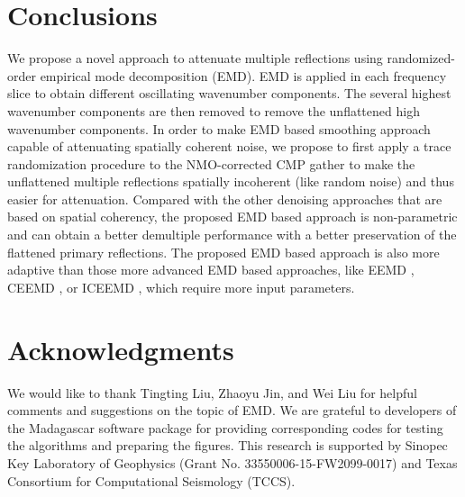 







\section{Conclusions}
We propose a novel approach to attenuate multiple reflections using randomized-order empirical mode decomposition (EMD). EMD is applied in each frequency slice to obtain different oscillating wavenumber components. The several highest wavenumber components are then removed to remove the unflattened high wavenumber components. In order to make EMD based smoothing approach capable of attenuating spatially coherent noise, we propose to first apply a trace randomization procedure to the NMO-corrected CMP gather to make the unflattened multiple reflections spatially incoherent (like random noise) and thus easier for attenuation. Compared with the other denoising approaches that are based on spatial coherency, the proposed EMD based approach is non-parametric and can obtain a better demultiple performance with a better preservation of the flattened primary reflections. The proposed EMD based approach is also more adaptive than those more advanced EMD based approaches, like EEMD \cite{eemd}, CEEMD \cite{epsceemd}, or ICEEMD \cite{iceemd2014}, which require more input parameters.

\section{Acknowledgments}
We would like to thank Tingting Liu, Zhaoyu Jin, and Wei Liu for helpful comments and suggestions on the topic of EMD. We are grateful to developers of the Madagascar software package for providing corresponding codes for testing the algorithms and preparing the figures. This research is supported by Sinopec Key Laboratory of Geophysics (Grant No. 33550006-15-FW2099-0017) and Texas Consortium for Computational Seismology (TCCS).











